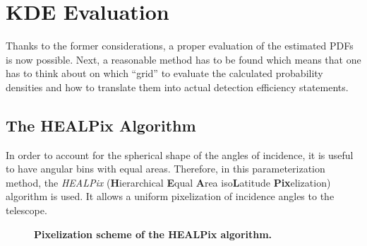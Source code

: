\section{KDE Evaluation}

Thanks to the former considerations, a proper evaluation of the estimated PDFs is now possible. Next, a reasonable method has to be found which means that one has to think about on which \enquote{grid} to evaluate the calculated probability densities and how to translate them into actual detection efficiency statements.

\subsection{The HEALPix Algorithm}

In order to account for the spherical shape of the angles of incidence, it is useful to have angular bins with equal areas. Therefore, in this parameterization method, the \textit{HEALPix} (\textbf{H}ierarchical \textbf{E}qual \textbf{A}rea iso\textbf{L}atitude \textbf{Pix}elization) algorithm is used. It allows a uniform pixelization of incidence angles to the telescope.\\

\begin{figure}[H]
	\centering
	\begin{subfigure}[t]{0.48\textwidth}
		\centering
		\label{}
	\end{subfigure}
	\hfill
	\begin{subfigure}[t]{0.48\textwidth}
		\centering
		\usebox{\savedimage}
		\label{}
	\end{subfigure}
	\caption[Pixelization scheme of the HEALPix algorithm]{\textbf{Pixelization scheme of the HEALPix algorithm.} \cite[adapted]{healpix:paper}}
	\label{healpix:pixelization}
\end{figure}

